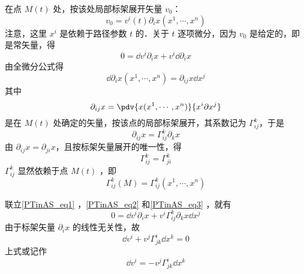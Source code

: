 在点 $M(t)$ 处，按该处局部标架展开矢量 $v_0$：
\begin{equation}
v_0=v^i(t)\partial_i x(x^1,\cdots,x^n)
\end{equation}
注意，这里 $x^i$ 是依赖于路径参数 $t$ 的．关于 $t$ 逐项微分，因为 $v_0$ 是给定的，即是常矢量，得
\begin{equation}\label{PTinAS_eq1}
0=\dd v^i\partial_i x+v^i\dd \partial_i x
\end{equation}
由全微分公式得
\begin{equation}\label{PTinAS_eq2}
\dd \partial_i x(x^1,\cdots,x^n)=\partial_{ij}x\dd x^j
\end{equation}
其中
\begin{equation}
\partial_{ij}x=\pdv{x(x^1,\cdots,x^n)}{x^i\partial x^j}
\end{equation}
是在 $M(t)$ 处确定的矢量，按该点的局部标架展开，其系数记为 $\Gamma^k_{ij}$，于是
\begin{equation}\label{PTinAS_eq3}
\partial_{ij}x=\Gamma^k_{ij}\partial_k x
\end{equation}
由 $\partial_{ij} x=\partial_{ji} x$，且按标架矢量展开的唯一性，得
\begin{equation}
\Gamma^k_{ij}=\Gamma^k_{ji}
\end{equation}
 $\Gamma^k_{ij}$ 显然依赖于点 $M(t)$ ，即
 \begin{equation}
 \Gamma^k_{ij}(M)=\Gamma^k_{ij}(x^1,\cdots,x^n)
 \end{equation}
 
联立\autoref{PTinAS_eq1} ，\autoref{PTinAS_eq2} 和\autoref{PTinAS_eq3} ，就有
\begin{equation}
0=\dd v^i\partial_i x+v^i\Gamma^k_{ij}\partial_k x\dd x^j
\end{equation}
由于标架矢量 $\partial_i x$ 的线性无关性，故
\begin{equation}
\dd v^i+v^j\Gamma^i_{jk}\dd x^k=0
\end{equation}
上式或记作
\begin{equation}
\dd v^i=-v^j\Gamma^i_{jk}\dd x^k
\end{equation}
